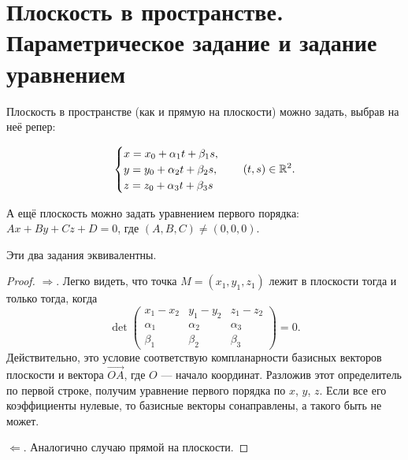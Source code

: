 \section{Плоскость в пространстве. Параметрическое задание и задание уравнением}

Плоскость в пространстве (как и прямую на плоскости) можно задать, выбрав на неё репер:

$$
\begin{cases}
    x = x_0 + \alpha_1 t + \beta_1 s,\\
    y = y_0 + \alpha_2 t + \beta_2 s,\\
    z = z_0 + \alpha_3 t + \beta_3 s
\end{cases}\quad (t, s) \in \mathbb{R}^2.
$$

А ещё плоскость можно задать уравнением первого порядка: $Ax + By + Cz + D = 0$, где $(A, B, C) \ne (0, 0, 0)$.

\begin{statement}
    Эти два задания эквивалентны.
\end{statement}

\begin{proof}
    $\Rightarrow$. Легко видеть, что точка $M = (x_1, y_1, z_1)$ лежит в плоскости тогда и только тогда, когда 
    $$\det
    \begin{pmatrix}
        x_1 - x_2 & y_1 - y_2 & z_1 - z_2\\
        \alpha_1 & \alpha_2 & \alpha_3\\
        \beta_1 & \beta_2 & \beta_3
    \end{pmatrix} = 0.
    $$
    Действительно, это условие соответствую компланарности базисных векторов плоскости и вектора $\overrightarrow{OA}$, где $O$ --- начало координат. Разложив этот определитель по первой строке, получим уравнение первого порядка по $x$, $y$, $z$. Если все его коэффициенты нулевые, то базисные векторы сонаправлены, а такого быть не может.

    $\Leftarrow$. Аналогично случаю прямой на плоскости.
\end{proof}


